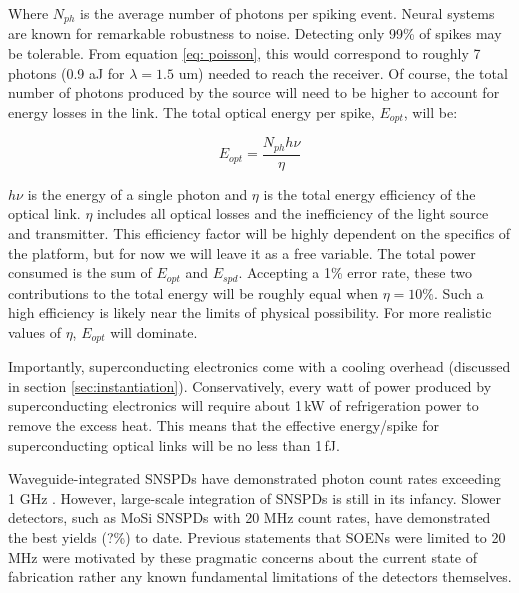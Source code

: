 \documentclass[twocolumn]{article}
\begin{document}
Where $N_{ph}$ is the average number of photons per spiking event. Neural systems are known for remarkable robustness to noise. Detecting only 99\% of spikes may be tolerable. From equation \ref{eq: poisson}, this would correspond to roughly 7 photons (0.9 aJ for $\lambda = 1.5$ um) needed to reach the receiver. Of course, the total number of photons produced by the source will need to be higher to account for energy losses in the link. The total optical energy per spike, $E_{opt}$, will be:

\begin{equation}
    E_{opt} = \frac{N_{ph} h \nu}{\eta}
\end{equation}

$h\nu$ is the energy of a single photon and $\eta$ is the total energy efficiency of the optical link. $\eta$ includes all optical losses and the inefficiency of the light source and transmitter. This efficiency factor will be highly dependent on the specifics of the platform, but for now we will leave it as a free variable. The total power consumed is the sum of $E_{opt}$ and $E_{spd}$. Accepting a 1\% error rate, these two contributions to the total energy will be roughly equal when $\eta = 10\%$. Such a high efficiency is likely near the limits of physical possibility. For more realistic values of $\eta$, $E_{opt}$ will dominate.

Importantly, superconducting electronics come with a cooling overhead (discussed in section \ref{sec:instantiation}). Conservatively, every watt of power produced by superconducting electronics will require about 1\,kW of refrigeration power to remove the excess heat. This means that the effective energy/spike for superconducting optical links will be no less than 1\,fJ.

Waveguide-integrated SNSPDs have demonstrated photon count rates exceeding 1 GHz \cite{vetter2016cavity}. However, large-scale integration of SNSPDs is still in its infancy. Slower detectors, such as MoSi SNSPDs with 20 MHz count rates, have demonstrated the best yields (?\%) to date. Previous statements that SOENs were limited to 20\,MHz were motivated by these pragmatic concerns about the current state of fabrication rather any known fundamental limitations of the detectors themselves.
\end{document}
